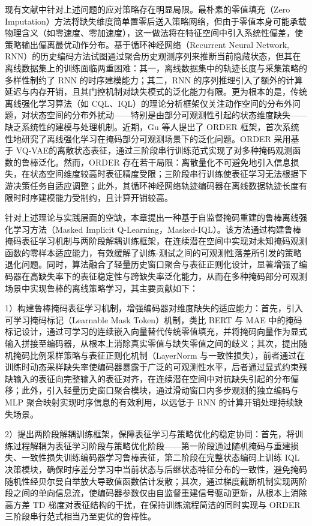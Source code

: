 现有文献中针对上述问题的应对策略存在明显局限。最朴素的零值填充（Zero Imputation）方法将缺失维度简单置零后送入策略网络，但由于零值本身可能承载物理含义（如零速度、零加速度），这一做法将在特征空间中引入系统性偏差，使策略输出偏离最优动作分布。基于循环神经网络（Recurrent Neural Network, RNN）的历史编码方法\cite{hausknecht2015deep}试图通过聚合历史观测序列来推断当前隐藏状态，但其在离线数据集上的训练面临两重困难：其一，离线数据集中的轨迹长度与采集策略的多样性制约了 RNN 的时序建模能力；其二，RNN 的序列推理引入了额外的计算延迟与内存开销，且其门控机制对缺失模式的泛化能力有限。更为根本的是，传统离线强化学习算法（如 CQL、IQL）的理论分析框架仅关注动作空间的分布外问题，对状态空间的分布外扰动——特别是由部分可观测性引起的状态维度缺失——缺乏系统性的建模与处理机制。近期，Gu 等人\cite{gu2023order}提出了 ORDER 框架，首次系统性地研究了离线强化学习在掩码部分可观测场景下的泛化问题。ORDER 采用基于 VQ-VAE\cite{van2017neural}的离散状态表征，通过三阶段串行训练范式实现了对多种掩码观测函数的鲁棒泛化。然而，ORDER 存在若干局限：离散量化不可避免地引入信息损失，在状态空间维度较高时表征精度受限；三阶段串行训练使表征学习无法根据下游决策任务自适应调整；此外，其循环神经网络轨迹编码器在离线数据轨迹长度有限时时序建模能力受制约，且计算开销较高。

针对上述理论与实践层面的空缺，本章提出一种基于自监督掩码重建的鲁棒离线强化学习方法（Masked Implicit Q-Learning，Masked-IQL）。该方法通过构建鲁棒掩码表征学习机制与两阶段解耦训练框架，在连续潜在空间中实现对未知掩码观测函数的零样本适应能力，有效缓解了训练-测试之间的可观测性落差所引发的策略退化问题。同时，算法融合了轻量历史窗口聚合与表征正则化设计，显著增强了编码器在高缺失率下的表征稳定性与跨缺失率泛化能力，从而在多种掩码部分可观测场景中实现鲁棒的离线策略学习，其主要贡献如下：

1）构建鲁棒掩码表征学习机制，增强编码器对维度缺失的适应能力：首先，引入可学习掩码标记（Learnable Mask Token）机制，类比 BERT\cite{devlin2019bert} 与 MAE\cite{he2022masked} 中的掩码标记设计，通过可学习的连续嵌入向量替代传统零值填充，并将掩码向量作为显式输入拼接至编码器，从根本上消除真实零值与缺失零值之间的歧义；其次，提出随机掩码比例采样策略与表征正则化机制（LayerNorm 与一致性损失），前者通过在训练时动态采样缺失率使编码器暴露于广泛的可观测性水平，后者通过显式约束残缺输入的表征向完整输入的表征对齐，在连续潜在空间中对抗缺失引起的分布偏移；此外，引入轻量历史窗口聚合模块，通过滑动窗口内多步观测的独立编码与 MLP 聚合映射实现时序信息的有效利用，以远低于 RNN 的计算开销处理持续缺失场景。

2）提出两阶段解耦训练框架，保障表征学习与策略优化的稳定协同：首先，将训练过程解耦为表征学习阶段与策略优化阶段——第一阶段通过随机掩码与重建损失、一致性损失训练编码器学习鲁棒表征，第二阶段在完整状态编码上训练 IQL 决策模块，确保时序差分学习中当前状态与后继状态特征分布的一致性，避免掩码随机性经贝尔曼自举放大导致值函数估计发散；其次，通过梯度截断机制实现两阶段之间的单向信息流，使编码器参数仅由自监督重建信号驱动更新，从根本上消除高方差 TD 梯度对表征结构的干扰，在保持训练流程简洁的同时实现与 ORDER 三阶段串行范式相当乃至更优的鲁棒性。

